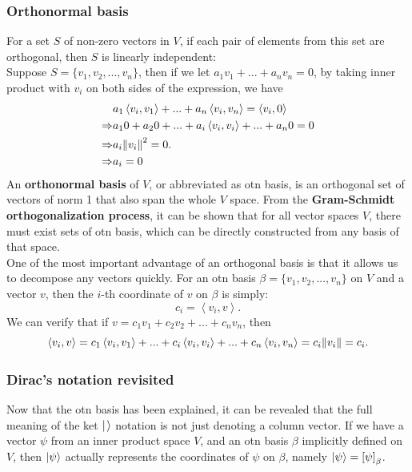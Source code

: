 \documentclass[12pt]{article}
\begin{document}
\subsubsection{Orthonormal basis}
For a set $S$ of non-zero vectors in $V$, if each pair of elements from this set are orthogonal, then $S$ is linearly independent:\\
Suppose $S=\{v_1, v_2, ..., v_n\}$, then if we let $a_1v_1+...+a_nv_n=0$, by taking inner product with $v_i$ on both sides of the expression, we have 
\begin{align*}
     &a_1\left<v_i,v_1\right>+...+ a_n\left<v_i,v_n\right>=\left<v_i,0\right>\\
    \Rightarrow & a_10+a_20+...+a_i\left<v_i,v_i\right>+...+a_n0=0\\
    \Rightarrow & a_i\norm{v_i}^2=0.\\
    \Rightarrow & a_i=0
\end{align*}
An \textbf{orthonormal basis} of $V$, or abbreviated as otn basis, is an orthogonal set of vectors of norm 1 that also span the whole $V$ space. From the \textbf{Gram-Schmidt orthogonalization process}, it can be shown that for all vector spaces $V$, there must exist sets of otn basis, which can be directly constructed from any basis of that space.\\

\noindent One of the most important advantage of an orthogonal basis is that it allows us to decompose any vectors quickly. For an otn basis $\beta=\{v_1, v_2,...,v_n\}$ on $V$ and a vector $v$, then the $i$-th coordinate of $v$ on $\beta$ is simply:
$$c_i=\left<v_i,v\right>.$$ We can verify that if $v=c_1v_1+c_2v_2+...+c_nv_n$, then $$\left<v_i,v\right>=c_1\left<v_i,v_1\right>+...+c_i\left<v_i,v_i\right>+...+c_n\left<v_i,v_n\right>=c_i\norm{v_i}=c_i.$$
\subsubsection{Dirac's notation revisited}
Now that the otn basis has been explained, it  can be revealed that the full meaning of the ket $\ket{\hspace{1pt}}$ notation is not just denoting a column vector. If we have a vector $\psi$ from an inner product space $V$, and an otn basis $\beta$ implicitly defined on $V$, then $\mathbf{\ket{\psi}}$ actually represents the coordinates of $\psi$ on $\beta$, namely $\ket{\psi}=\left[\psi\right]_\beta$. \\
\end{document}

